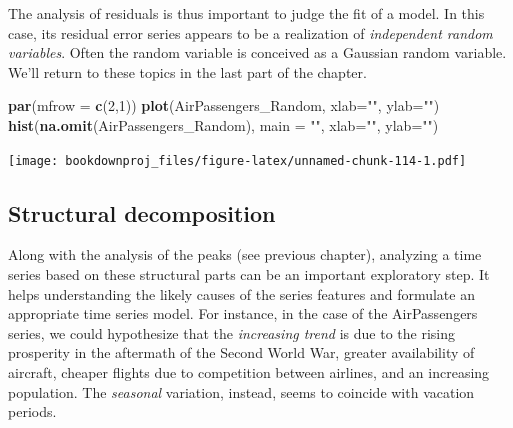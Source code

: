 \documentclass[
]{article}
\newenvironment{Shaded}{\begin{snugshade}}{\end{snugshade}}
\newcommand{\DataTypeTok}[1]{\textcolor[rgb]{0.13,0.29,0.53}{#1}}
\newcommand{\DecValTok}[1]{\textcolor[rgb]{0.00,0.00,0.81}{#1}}
\newcommand{\KeywordTok}[1]{\textcolor[rgb]{0.13,0.29,0.53}{\textbf{#1}}}
\newcommand{\NormalTok}[1]{#1}
\newcommand{\OperatorTok}[1]{\textcolor[rgb]{0.81,0.36,0.00}{\textbf{#1}}}
\newcommand{\StringTok}[1]{\textcolor[rgb]{0.31,0.60,0.02}{#1}}
\begin{document}
The analysis of residuals is thus important to judge the fit of a model. In this case, its residual error series appears to be a realization of \emph{independent random variables}. Often the random variable is conceived as a Gaussian random variable. We'll return to these topics in the last part of the chapter.

\begin{Shaded}
\end{Shaded}

\begin{Shaded}
\begin{Highlighting}[]
\KeywordTok{par}\NormalTok{(}\DataTypeTok{mfrow =} \KeywordTok{c}\NormalTok{(}\DecValTok{2}\NormalTok{,}\DecValTok{1}\NormalTok{))}
\KeywordTok{plot}\NormalTok{(AirPassengers_Random, }\DataTypeTok{xlab=}\StringTok{""}\NormalTok{, }\DataTypeTok{ylab=}\StringTok{""}\NormalTok{)}
\KeywordTok{hist}\NormalTok{(}\KeywordTok{na.omit}\NormalTok{(AirPassengers_Random), }\DataTypeTok{main =} \StringTok{""}\NormalTok{, }\DataTypeTok{xlab=}\StringTok{""}\NormalTok{, }\DataTypeTok{ylab=}\StringTok{""}\NormalTok{)}
\end{Highlighting}
\end{Shaded}

\texttt{[image: bookdownproj\_files/figure-latex/unnamed-chunk-114-1.pdf]}

\hypertarget{structural-decomposition-1}{%
\subsection{Structural decomposition}\label{structural-decomposition-1}}

Along with the analysis of the peaks (see previous chapter), analyzing a time series based on these structural parts can be an important exploratory step. It helps understanding the likely causes of the series features and formulate an appropriate time series model. For instance, in the case of the AirPassengers series, we could hypothesize that the \emph{increasing trend} is due to the rising prosperity in the aftermath of the Second World War, greater availability of aircraft, cheaper flights due to competition between airlines, and an increasing population. The \emph{seasonal} variation, instead, seems to coincide with vacation periods.
\end{document}

